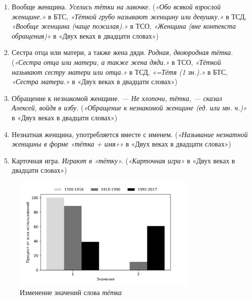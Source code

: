 \begin{enumerate}
    \item Вообще женщина. \textit{Уселись тётки на лавочке.}
(\textit{«Обо всякой взрослой женщине.»} в БТС,
\textit{«Тёткой грубо называют женщину или девушку.»} в ТСД,
\textit{«Вообще женщина (чаще пожилая).»} в ТСО,
\textit{«Женщина (вне контекста обращения)»} в «Двух веках в двадцати словах»)

    \item Сестра отца или матери, а также жена дяди.  \textit{Родная, двоюродная тётка.}
(\textit{«Сестра отца или матери, а также жена дяди.»} в ТСО,
\textit{«Тёткой называют сестру матери или отца.»} в ТСД,
\textit{«=Тётя (1 зн.).»} в БТС,
\textit{«Сестра матери.»} в «Двух веках в двадцати словах»)

    \item Обращение к незнакомой женщине. \textit{— Не хлопочи, тётка, — сказал Алексей, войдя в избу.}
(\textit{«Обращение к незнакомой женщине (ед. или мн. ч.)»} в «Двух веках в двадцати словах»)

    \item Незнатная женщина, употребляется вместе с именем.
(\textit{«Называние незнатной женщины в форме «тётка + имя»»} в «Двух веках в двадцати словах»)
%
    \item Карточная игра. \textit{Играют в «тётку».}
(\textit{«Карточная игра»} в «Двух веках в двадцати словах»)
\end{enumerate}

\begin{figure}[H]
	\centering
	\includegraphics[width=0.8\textwidth]{img/visualizations/tetka_minimal}
	\caption{Изменение значений слова \textit{тётка}}
	\label{fig:Тётка}
\end{figure}

